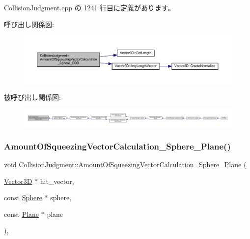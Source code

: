  Collision\+Judgment.\+cpp の 1241 行目に定義があります。

呼び出し関係図\+:\nopagebreak
\begin{figure}[H]
\begin{center}
\leavevmode
\includegraphics[width=350pt]{class_collision_judgment_a0d9af21fba97d2f396c8200b6fccaeb4_cgraph}
\end{center}
\end{figure}
被呼び出し関係図\+:
\nopagebreak
\begin{figure}[H]
\begin{center}
\leavevmode
\includegraphics[width=350pt]{class_collision_judgment_a0d9af21fba97d2f396c8200b6fccaeb4_icgraph}
\end{center}
\end{figure}
\mbox{\label{class_collision_judgment_a6d5a391e5cc4bdafff98d04c219f9087}} 
\subsubsection{\texorpdfstring{Amount\+Of\+Squeezing\+Vector\+Calculation\+\_\+\+Sphere\+\_\+\+Plane()}{AmountOfSqueezingVectorCalculation\_Sphere\_Plane()}}
{\footnotesize\ttfamily void Collision\+Judgment\+::\+Amount\+Of\+Squeezing\+Vector\+Calculation\+\_\+\+Sphere\+\_\+\+Plane (\begin{DoxyParamCaption}\item[{\mbox{\hyperlink{class_vector3_d}{Vector3D}} $\ast$}]{hit\+\_\+vector,  }\item[{const \mbox{\hyperlink{class_sphere}{Sphere}} $\ast$}]{sphere,  }\item[{const \mbox{\hyperlink{class_plane}{Plane}} $\ast$}]{plane }\end{DoxyParamCaption})\hspace{0.3cm}{\ttfamily [static]}, {\ttfamily [private]}}



